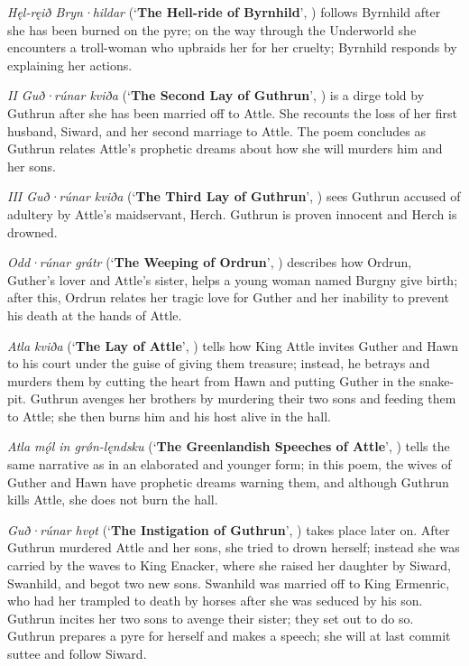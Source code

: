\emph{Hęl-ręið Bryn·hildar} (‘\textbf{The Hell-ride of Byrnhild}’, ) follows Byrnhild after she has been burned on the pyre; on the way through the Underworld she encounters a troll-woman who upbraids her for her cruelty; Byrnhild responds by explaining her actions.

\emph{II Guð·rúnar kviða} (‘\textbf{The Second Lay of Guthrun}’, ) is a dirge told by Guthrun after she has been married off to Attle.  She recounts the loss of her first husband, Siward, and her second marriage to Attle.  The poem concludes as Guthrun relates Attle’s prophetic dreams about how she will murders him and her sons.

\emph{III Guð·rúnar kviða} (‘\textbf{The Third Lay of Guthrun}’, ) sees Guthrun accused of adultery by Attle’s maidservant, Herch.  Guthrun is proven innocent and Herch is drowned.

\emph{Odd·rúnar grátr} (‘\textbf{The Weeping of Ordrun}’, ) describes how Ordrun, Guther’s lover and Attle’s sister, helps a young woman named Burgny give birth; after this, Ordrun relates her tragic love for Guther and her inability to prevent his death at the hands of Attle.

\emph{Atla kviða} (‘\textbf{The Lay of Attle}’, ) tells how King Attle invites Guther and Hawn to his court under the guise of giving them treasure; instead, he betrays and murders them by cutting the heart from Hawn and putting Guther in the snake-pit.  Guthrun avenges her brothers by murdering their two sons and feeding them to Attle; she then burns him and his host alive in the hall.

\emph{Atla mǫ́l in grǿn-lęndsku} (‘\textbf{The Greenlandish Speeches of Attle}’, ) tells the same narrative as  in an elaborated and younger form; in this poem, the wives of Guther and Hawn have prophetic dreams warning them, and although Guthrun kills Attle, she does not burn the hall.

\emph{Guð·rúnar hvǫt} (‘\textbf{The Instigation of Guthrun}’, ) takes place later on.  After Guthrun murdered Attle and her sons, she tried to drown herself; instead she was carried by the waves to King Enacker, where she raised her daughter by Siward, Swanhild, and begot two new sons.  Swanhild was married off to King Ermenric, who had her trampled to death by horses after she was seduced by his son.  Guthrun incites her two sons to avenge their sister; they set out to do so.  Guthrun prepares a pyre for herself and makes a speech; she will at last commit suttee and follow Siward.

